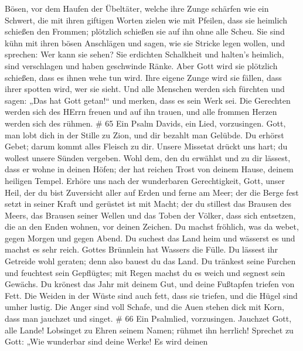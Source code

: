 Bösen, vor dem Haufen der Übeltäter,  welche ihre Zunge
schärfen wie ein Schwert, die mit ihren giftigen Worten zielen wie mit
Pfeilen,  dass sie heimlich schießen den Frommen; plötzlich
schießen sie auf ihn ohne alle Scheu.  Sie sind kühn mit
ihren bösen Anschlägen und sagen, wie sie Stricke legen wollen, und
sprechen: Wer kann sie sehen?  Sie erdichten Schalkheit und
halten's heimlich, sind verschlagen und haben geschwinde Ränke.
 Aber Gott wird sie plötzlich schießen, dass es ihnen wehe
tun wird.  Ihre eigene Zunge wird sie fällen, dass ihrer
spotten wird, wer sie sieht.  Und alle Menschen werden sich
fürchten und sagen: „Das hat Gott getan!{}`` und merken, dass es sein
Werk sei.  Die Gerechten werden sich des HErrn freuen und
auf ihn trauen, und alle frommen Herzen werden sich des rühmen. \# 65
 Ein Psalm Davids, ein Lied, vorzusingen.  Gott,
man lobt dich in der Stille zu Zion, und dir bezahlt man Gelübde.
 Du erhörst Gebet; darum kommt alles Fleisch zu dir.
 Unsere Missetat drückt uns hart; du wollest unsere Sünden
vergeben.  Wohl dem, den du erwählst und zu dir lässest,
dass er wohne in deinen Höfen; der hat reichen Trost von deinem Hause,
deinem heiligen Tempel.  Erhöre uns nach der wunderbaren
Gerechtigkeit, Gott, unser Heil, der du bist Zuversicht aller auf Erden
und ferne am Meer;  der die Berge fest setzt in seiner Kraft
und gerüstet ist mit Macht;  der du stillest das Brausen des
Meers, das Brausen seiner Wellen und das Toben der Völker, 
dass sich entsetzen, die an den Enden wohnen, vor deinen Zeichen. Du
machst fröhlich, was da webet, gegen Morgen und gegen Abend.
 Du suchest das Land heim und wässerst es und machst es
sehr reich. Gottes Brünnlein hat Wassers die Fülle. Du lässest ihr
Getreide wohl geraten; denn also bauest du das Land.  Du
tränkest seine Furchen und feuchtest sein Gepflügtes; mit Regen machst
du es weich und segnest sein Gewächs.  Du krönest das Jahr
mit deinem Gut, und deine Fußtapfen triefen von Fett.  Die
Weiden in der Wüste sind auch fett, dass sie triefen, und die Hügel sind
umher lustig.  Die Anger sind voll Schafe, und die Auen
stehen dick mit Korn, dass man jauchzet und singet. \# 66 
Ein Psalmlied, vorzusingen. Jauchzet Gott, alle Lande! 
Lobsinget zu Ehren seinem Namen; rühmet ihn herrlich! 
Sprechet zu Gott: „Wie wunderbar sind deine Werke! Es wird deinen
